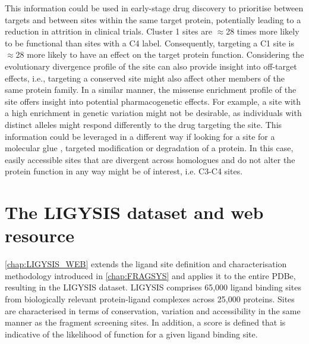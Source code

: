 This information could be used in early-stage drug discovery to prioritise between targets and between sites within the same target protein, potentially leading to a reduction in attrition in clinical trials. Cluster 1 sites are $\approx$28 times more likely to be functional than sites with a C4 label. Consequently, targeting a C1 site is $\approx$28 more likely to have an effect on the target protein function. Considering the evolutionary divergence profile of the site can also provide insight into off-target effects, i.e., targeting a conserved site might also affect other members of the same protein family. In a similar manner, the missense enrichment profile of the site offers insight into potential pharmacogenetic effects. For example, a site with a high enrichment in genetic variation might not be desirable, as individuals with distinct alleles might respond differently to the drug targeting the site. This information could be leveraged in a different way if looking for a site for a molecular glue \cite{SCHREIBER_2021_GLUES}, targeted modification \cite{BREWER_2024_ATLAS, BREWER_2024_SMAD3, ZHAO_2024_TFEB} or degradation \cite{ZENGERLE_2015_BRD4, GADD_2017_PROTAC} of a protein. In this case, easily accessible sites that are divergent across homologues and do not alter the protein function in any way might be of interest, i.e. C3-C4 sites.

\section{The LIGYSIS dataset and web resource}

\autoref{chap:LIGYSIS_WEB} extends the ligand site definition and characterisation methodology introduced in \autoref{chap:FRAGSYS} and applies it to the entire PDBe, resulting in the LIGYSIS dataset. LIGYSIS comprises 65,000 ligand binding sites from biologically relevant protein-ligand complexes across 25,000 proteins. Sites are characterised in terms of conservation, variation and accessibility in the same manner as the fragment screening sites. In addition, a score is defined that is indicative of the likelihood of function for a given ligand binding site. %


